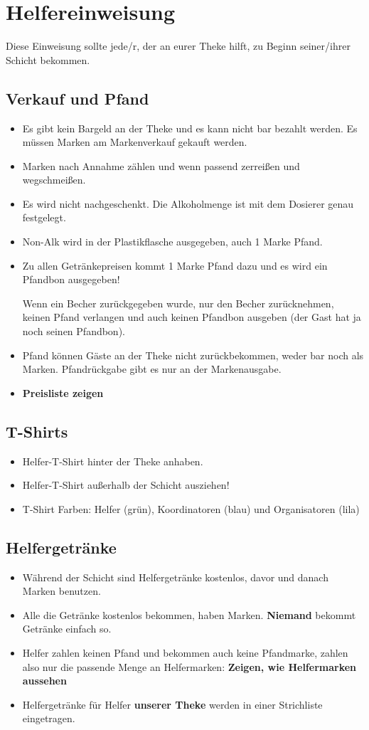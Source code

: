 \section{Helfereinweisung}
Diese Einweisung sollte jede/r, der an eurer Theke hilft, zu Beginn seiner/ihrer Schicht bekommen.
\subsection{Verkauf und Pfand}
\begin{itemize}
  \renewcommand{\labelitemi}{$\Box$}
  \item Es gibt kein Bargeld an der Theke und es kann nicht bar bezahlt werden. Es müssen Marken am Markenverkauf gekauft werden.
  \item Marken nach Annahme zählen und wenn passend zerreißen und wegschmeißen.
  \item Es wird nicht nachgeschenkt. Die Alkoholmenge ist mit dem Dosierer genau festgelegt.
  \item Non-Alk wird in der Plastikflasche ausgegeben, auch 1 Marke Pfand.
  \item Zu allen Getränkepreisen kommt 1 Marke Pfand dazu und es wird ein Pfandbon ausgegeben!
    
    Wenn ein Becher zurückgegeben wurde, nur den Becher zurücknehmen, keinen Pfand verlangen und auch keinen Pfandbon ausgeben (der Gast hat ja noch seinen Pfandbon).
  \item Pfand können Gäste an der Theke nicht zurückbekommen, weder bar noch als Marken. Pfandrückgabe gibt es nur an der Markenausgabe.
  \item \textbf{Preisliste zeigen}
\end{itemize}
\subsection{T-Shirts}
\begin{itemize}
  \renewcommand{\labelitemi}{$\Box$}
  \item Helfer-T-Shirt hinter der Theke anhaben.
  \item Helfer-T-Shirt außerhalb der Schicht ausziehen!
  \item T-Shirt Farben: Helfer (grün), Koordinatoren (blau) und Organisatoren (lila)
\end{itemize}
\subsection{Helfergetränke}
\begin{itemize}
  \renewcommand{\labelitemi}{$\Box$}
  \item Während der Schicht sind Helfergetränke kostenlos, davor und danach Marken benutzen.
  \item Alle die Getränke kostenlos bekommen, haben Marken. \textbf{Niemand} bekommt Getränke einfach so.
  \item Helfer zahlen keinen Pfand und bekommen auch keine Pfandmarke, zahlen also nur die passende Menge an Helfermarken: \textbf{Zeigen, wie Helfermarken aussehen}
  \item Helfergetränke für Helfer \textbf{unserer Theke} werden in einer Strichliste eingetragen.
\end{itemize}
